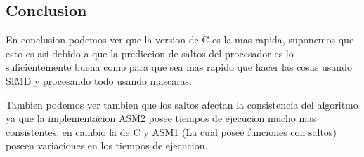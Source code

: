 





\subsection{Conclusion}
En conclusion podemos ver que la version de C es la mas rapida, suponemos que esto es asi debido a que la prediccion de saltos del procesador es lo suficientemente buena como para que sea mas rapido que hacer las cosas usando SIMD y procesando todo usando mascaras.

Tambien podemos ver tambien que los saltos afectan la consistencia del algoritmo ya que la implementacion ASM2 posee tiempos de ejecucion mucho mas consistentes, en cambio la de C y ASM1 (La cual posee funciones con saltos) poseen variaciones en los tiempos de ejecucion.

